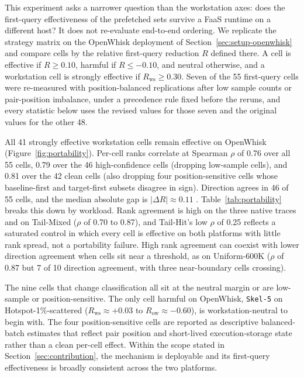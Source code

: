\documentclass[sigconf, nonacm]{acmart}
\begin{document}
This experiment asks a narrower question than the workstation axes: does the first-query effectiveness of the prefetched sets survive a FaaS runtime on a different host? It does not re-evaluate end-to-end ordering. We replicate the strategy matrix on the OpenWhisk deployment of Section~\ref{sec:setup-openwhisk} and compare cells by the relative first-query reduction $R$ defined there. A cell is effective if $R \geq 0.10$, harmful if $R \leq -0.10$, and neutral otherwise, and a workstation cell is strongly effective if $R_\text{ws} \geq 0.30$. Seven of the 55 first-query cells were re-measured with position-balanced replications after low sample counts or pair-position imbalance, under a precedence rule fixed before the reruns, and every statistic below uses the revised values for those seven and the original values for the other 48.

All 41 strongly effective workstation cells remain effective on OpenWhisk (Figure~\ref{fig:portability}). Per-cell ranks correlate at Spearman $\rho$ of 0.76 over all 55 cells, 0.79 over the 46 high-confidence cells (dropping low-sample cells), and 0.81 over the 42 clean cells (also dropping four position-sensitive cells whose baseline-first and target-first subsets disagree in sign). Direction agrees in 46 of 55 cells, and the median absolute gap is $|\Delta R| \approx 0.11$
. Table~\ref{tab:portability} breaks this down by workload. Rank agreement is high on the three native traces and on Tail-Mixed ($\rho$ of 0.70 to 0.87), and Tail-Hit's low $\rho$ of 0.25 reflects a saturated control in which every cell is effective on both platforms with little rank spread, not a portability failure. High rank agreement can coexist with lower direction agreement when cells sit near a threshold, as on Uniform-600K ($\rho$ of 0.87 but 7 of 10 direction agreement, with three near-boundary cells crossing).

The nine cells that change classification all sit at the neutral margin or are low-sample or position-sensitive. The only cell harmful on OpenWhisk, \texttt{Skel-5} on Hotspot-1\%-scattered ($R_{\text{ws}} \approx +0.03$ to $R_{\text{ow}} \approx -0.60$), is workstation-neutral to begin with. The four position-sensitive cells are reported as descriptive balanced-batch estimates that reflect pair position and short-lived execution-storage state rather than a clean per-cell effect. Within the scope stated in Section~\ref{sec:contribution}, the mechanism is deployable and its first-query effectiveness is broadly consistent across the two platforms.
\end{document}

